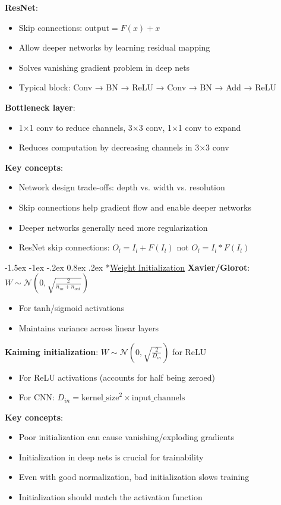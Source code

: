 \documentclass{article}
\makeatletter
\renewcommand\section{\@startsection{section}{1}{\z@}%
                                  {-1.5ex \@plus -1ex \@minus -.2ex}%
                                  {0.8ex \@plus.2ex}%
                                  {\normalfont\small\bfseries}}
\makeatother
\begin{document}
\begin{multicols}{3}
\textbf{ResNet}:
\begin{itemize}
\item Skip connections: $\text{output} = F(x) + x$
\item Allow deeper networks by learning residual mapping
\item Solves vanishing gradient problem in deep nets
\item Typical block: Conv → BN → ReLU → Conv → BN → Add → ReLU
\end{itemize}

\textbf{Bottleneck layer}:
\begin{itemize}
\item 1×1 conv to reduce channels, 3×3 conv, 1×1 conv to expand
\item Reduces computation by decreasing channels in 3×3 conv
\end{itemize}

\textbf{Key concepts}:
\begin{itemize}
\item Network design trade-offs: depth vs. width vs. resolution
\item Skip connections help gradient flow and enable deeper networks
\item Deeper networks generally need more regularization
\item ResNet skip connections: $O_l = I_l + F(I_l)$ not $O_l = I_l * F(I_l)$
\end{itemize}

\section*{\underline{Weight Initialization}}
\textbf{Xavier/Glorot}: $W \sim \mathcal{N}(0, \sqrt{\frac{2}{n_{in} + n_{out}}})$
\begin{itemize}
\item For tanh/sigmoid activations
\item Maintains variance across linear layers
\end{itemize}

\textbf{Kaiming initialization}: $W \sim \mathcal{N}(0, \sqrt{\frac{2}{D_{in}}})$ for ReLU
\begin{itemize}
\item For ReLU activations (accounts for half being zeroed)
\item For CNN: $D_{in} = \text{kernel\_size}^2 \times \text{input\_channels}$
\end{itemize}

\textbf{Key concepts}:
\begin{itemize}
\item Poor initialization can cause vanishing/exploding gradients
\item Initialization in deep nets is crucial for trainability
\item Even with good normalization, bad initialization slows training
\item Initialization should match the activation function
\end{itemize}


\end{multicols}
\end{document}
